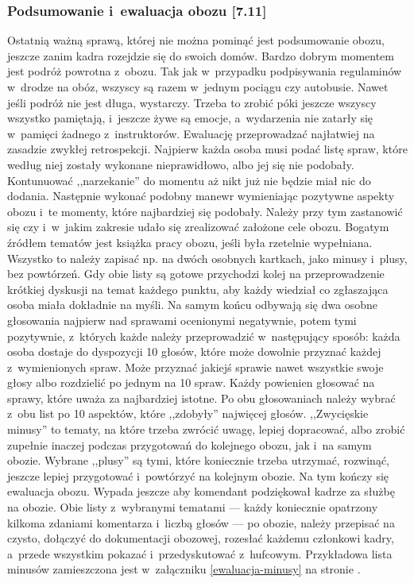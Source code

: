 \documentclass[a5paper,10pt,titlepage,twoside]{article}
\begin{document}
\subsubsection{Podsumowanie i~ewaluacja obozu [7.11]}
Ostatnią ważną sprawą, której nie można pominąć jest podsumowanie obozu, jeszcze zanim kadra rozejdzie się do swoich domów. Bardzo dobrym momentem jest podróż powrotna z~obozu. Tak jak w~przypadku podpisywania regulaminów w~drodze na obóz, wszyscy są razem w~jednym pociągu czy autobusie. Nawet jeśli podróż nie jest długa, wystarczy. Trzeba to zrobić póki jeszcze wszyscy wszystko pamiętają, i~jeszcze żywe są emocje, a~wydarzenia nie zatarły się w~pamięci żadnego z~instruktorów. Ewaluację przeprowadzać najłatwiej na zasadzie zwykłej retrospekcji. Najpierw każda osoba musi podać listę spraw, które według niej zostały wykonane nieprawidłowo, albo jej się nie podobały. Kontunuować ,,narzekanie'' do momentu aż nikt już nie będzie miał nic do dodania. Następnie wykonać podobny manewr wymieniając pozytywne aspekty obozu i~te momenty, które najbardziej się podobały. Należy przy tym zastanowić się czy i~w~jakim zakresie udało się zrealizować założone cele obozu. Bogatym źródłem tematów jest książka pracy obozu, jeśli była rzetelnie wypełniana. Wszystko to należy zapisać np. na dwóch osobnych kartkach, jako minusy i~plusy, bez powtórzeń. Gdy obie listy są gotowe przychodzi kolej na przeprowadzenie krótkiej dyskusji na temat każdego punktu, aby każdy wiedział co zgłaszająca osoba miała dokładnie na myśli. Na samym końcu odbywają się dwa osobne głosowania najpierw nad sprawami ocenionymi negatywnie, potem tymi pozytywnie, z~których każde należy przeprowadzić w~następujący sposób: każda osoba dostaje do dyspozycji 10 głosów, które może dowolnie przyznać każdej z~wymienionych spraw. Może przyznać jakiejś sprawie nawet wszystkie swoje głosy albo rozdzielić po jednym na 10 spraw. Każdy powienien głosować na sprawy, które uważa za najbardziej istotne. Po obu głosowaniach należy wybrać z~obu list po 10 aspektów, które ,,zdobyły'' najwięcej głosów. ,,Zwycięskie minusy'' to tematy, na które trzeba zwrócić uwagę, lepiej dopracować, albo zrobić zupełnie inaczej podczas przygotowań do kolejnego obozu, jak i~na samym obozie. Wybrane ,,plusy'' są tymi, które koniecznie trzeba utrzymać, rozwinąć, jeszcze lepiej przygotować i~powtórzyć na kolejnym obozie. Na tym kończy się ewaluacja obozu. Wypada jeszcze aby komendant podziękował kadrze za służbę na obozie. Obie listy z~wybranymi tematami --- każdy koniecznie opatrzony kilkoma zdaniami komentarza i~liczbą głosów --- po obozie, należy przepisać na czysto, dołączyć do dokumentacji obozowej, rozesłać każdemu członkowi kadry, a~przede wszystkim pokazać i~przedyskutować z~hufcowym. Przykładowa lista minusów zamieszczona jest w~załączniku \ref{ewaluacja-minusy} na stronie \pageref{ewaluacja-minusy}.
\end{document}

